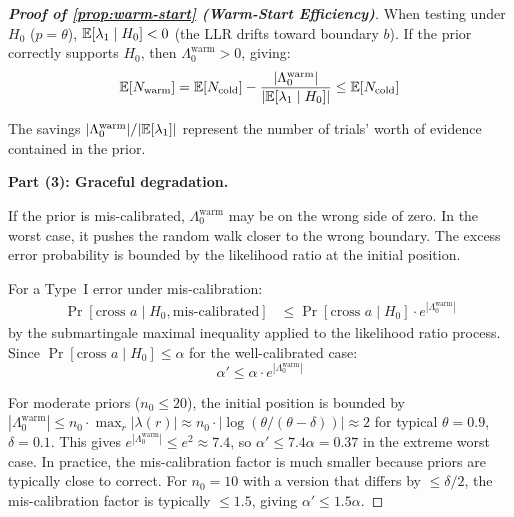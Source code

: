 \begin{proof}[\textbf{Proof of \cref{prop:warm-start} (Warm-Start Efficiency)}]
When testing under $H_0$ ($p = \theta$), $\mathbb{E}[\lambda_1 \mid H_0] < 0$
(the LLR drifts toward boundary $b$). If the prior correctly supports
$H_0$, then $\Lambda_0^{\mathrm{warm}} > 0$, giving:
\begin{equation}
  \mathbb{E}[N_{\mathrm{warm}}] = \mathbb{E}[N_{\mathrm{cold}}] -
    \frac{|\Lambda_0^{\mathrm{warm}}|}{|\mathbb{E}[\lambda_1 \mid H_0]|}
  \leq \mathbb{E}[N_{\mathrm{cold}}]
\end{equation}

The savings $|\Lambda_0^{\mathrm{warm}}| / |\mathbb{E}[\lambda_1]|$ represent
the number of trials' worth of evidence contained in the prior.

\textbf{Part (3): Graceful degradation.}

If the prior is mis-calibrated, $\Lambda_0^{\mathrm{warm}}$ may be on
the wrong side of zero. In the worst case, it pushes the random walk
closer to the wrong boundary. The excess error probability is bounded
by the likelihood ratio at the initial position.

For a Type~I error under mis-calibration:
\begin{align}
  \Pr[\text{cross } a \mid H_0, \text{mis-calibrated}]
  &\leq \Pr[\text{cross } a \mid H_0] \cdot
    e^{|\Lambda_0^{\mathrm{warm}}|}
\end{align}
by the submartingale maximal inequality applied to the likelihood ratio
process. Since $\Pr[\text{cross } a \mid H_0] \leq \alpha$ for the
well-calibrated case:
\begin{equation}
  \alpha' \leq \alpha \cdot e^{|\Lambda_0^{\mathrm{warm}}|}
\end{equation}

For moderate priors ($n_0 \leq 20$), the initial position is bounded
by $|\Lambda_0^{\mathrm{warm}}| \leq n_0 \cdot \max_r |\lambda(r)|
\approx n_0 \cdot |\log(\theta/(\theta-\delta))| \approx 2$ for
typical $\theta = 0.9$, $\delta = 0.1$. This gives
$e^{|\Lambda_0^{\mathrm{warm}}|} \leq e^2 \approx 7.4$, so
$\alpha' \leq 7.4\alpha = 0.37$ in the extreme worst case. In
practice, the mis-calibration factor is much smaller because priors
are typically close to correct. For $n_0 = 10$ with a version that
differs by $\leq \delta/2$, the mis-calibration factor is typically
$\leq 1.5$, giving $\alpha' \leq 1.5\alpha$. \qedhere
\end{proof}
